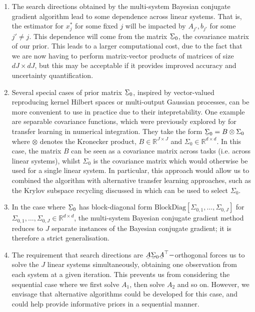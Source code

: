 \documentclass[twoside]{article}
\newcommand\barbelow[1]{\stackunder[1.2pt]{$#1$}{\rule{.8ex}{.075ex}}}
\begin{document}
\begin{enumerate}

	\item The search directions obtained by the multi-system Bayesian conjugate gradient algorithm lead to some dependence across linear systems. That is, the estimator for $x_j^*$ for some fixed $j$ will be impacted by $A_{j'},b_{j'}$ for some $j' \neq j$. This dependence will come from the matrix $\barbelow{\Sigma}_0$, the covariance matrix of our prior. This leads to a larger computational cost, due to the fact that we are now having to perform matrix-vector products of matrices of size $dJ \times dJ$, but this may be acceptable if it provides improved accuracy and uncertainty quantification.

	\item Several special cases of prior matrix $\barbelow{\Sigma}_0$, inspired by vector-valued reproducing kernel Hilbert spaces \citep{Alvarez2011Review} or multi-output Gaussian processes, can be more convenient to use in practice due to their intepretability. One example are separable covariance functions, which were previously explored by \cite{Xi2018MultiOutput} for transfer learning in numerical integration. They take the form $\barbelow{\Sigma}_{0}= B \otimes \Sigma_{0}$ where $\otimes$ denotes the Kronecker product, $B \in \mathbb{R}^{J \times J}$ and $\Sigma_0 \in \mathbb{R}^{d \times d}$. In this case, the matrix $B$ can be seen as a covariance matrix across tasks (i.e. across linear systems), whilst $\Sigma_0$ is the covariance matrix which would otherwise be used for a single linear system. In particular, this approach would allow us to combined the algorithm with alternative transfer learning approaches, such as the Krylov subspace recycling discussed in \cite{DeRoos2017} which can be used to select $\Sigma_0$.

	\item In the case where $\barbelow{\Sigma}_0$ has block-diagonal form $\text{BlockDiag}\left[\Sigma_{0,1},\ldots,\Sigma_{0,J}\right]$ for $\Sigma_{0,1},\ldots,\Sigma_{0,J} \in \mathbb{R}^{d \times d}$, the multi-system Bayesian conjugate gradient method reduces to $J$ separate instances of the Bayesian conjugate gradient; it is therefore a strict generalisation.


	\item The requirement that search directions are $\barbelow{A} \barbelow{\Sigma}_0 \barbelow{A}^\top-$orthogonal forces us to solve the $J$ linear systems simultaneously, obtaining one observation from each system at a given iteration. This prevents us from considering the sequential case where we first solve $A_1$, then solve $A_2$ and so on. However, we envisage that alternative algorithms could be developed for this case, and could help provide informative priors in a sequential manner.

\end{enumerate}



\end{document}
